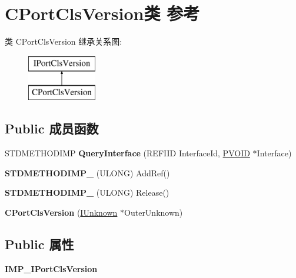 \hypertarget{class_c_port_cls_version}{}\section{C\+Port\+Cls\+Version类 参考}
\label{class_c_port_cls_version}
类 C\+Port\+Cls\+Version 继承关系图\+:\begin{figure}[H]
\begin{center}
\leavevmode
\includegraphics[height=2.000000cm]{class_c_port_cls_version}
\end{center}
\end{figure}
\subsection*{Public 成员函数}
\begin{DoxyCompactItemize}
\item 
\mbox{\label{class_c_port_cls_version_adab7341406ebf958b956405f3adaf84a}} 
S\+T\+D\+M\+E\+T\+H\+O\+D\+I\+MP {\bfseries Query\+Interface} (R\+E\+F\+I\+ID Interface\+Id, \hyperlink{interfacevoid}{P\+V\+O\+ID} $\ast$Interface)
\item 
\mbox{\label{class_c_port_cls_version_a59cc9eb9cd9ec3f6d3c92556bf3097fb}} 
{\bfseries S\+T\+D\+M\+E\+T\+H\+O\+D\+I\+M\+P\+\_\+} (U\+L\+O\+NG) Add\+Ref()
\item 
\mbox{\label{class_c_port_cls_version_a9b669f7c33bb06585f4d9337875afb40}} 
{\bfseries S\+T\+D\+M\+E\+T\+H\+O\+D\+I\+M\+P\+\_\+} (U\+L\+O\+NG) Release()
\item 
\mbox{\label{class_c_port_cls_version_a248f2599b57168b1e7c4bfff3e86ac9d}} 
{\bfseries C\+Port\+Cls\+Version} (\hyperlink{interface_i_unknown}{I\+Unknown} $\ast$Outer\+Unknown)
\end{DoxyCompactItemize}
\subsection*{Public 属性}
\begin{DoxyCompactItemize}
\item 
\mbox{\label{class_c_port_cls_version_a1d4a76b42ac712d5e639f3c3452b519a}} 
{\bfseries I\+M\+P\+\_\+\+I\+Port\+Cls\+Version}
\end{DoxyCompactItemize}
